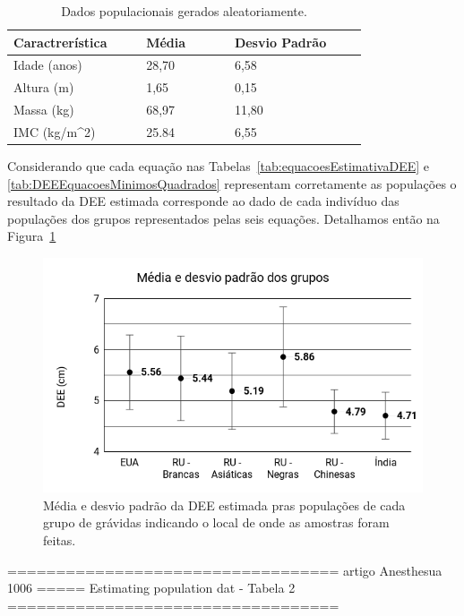 \begin{table}[!ht]
\begin{center}
\caption{Dados populacionais gerados aleatoriamente.}
\label{tab:DadosPopulacaoGerada}
\begin{tabular}{|p{0.3\linewidth}|p{0.2\linewidth}|p{0.3\linewidth}|}
\hline
\textbf{Caractrerística} & \textbf{Média} & \textbf{Desvio Padrão}\\
\hline\hline
Idade (anos) & 28,70 & 6,58\\
Altura (m) & 1,65 & 0,15\\
Massa (kg) & 68,97 & 11,80\\
IMC (kg/m^2) & 25.84 & 6,55\\
\hline
\end{tabular}
\end{center}
\end{table}

Considerando que cada equação nas Tabelas~\ref{tab:equacoesEstimativaDEE} e \ref{tab:DEEEquacoesMinimosQuadrados} representam corretamente as populações o resultado da \acrshort{DEE} estimada corresponde ao dado de cada indivíduo das populações dos grupos representados pelas seis equações. Detalhamos então na Figura~\ref{fig:mediaDesvioPadraoPopulacoes}

\begin{figure}[ht!]
    \centering
    \includegraphics[width=0.9\linewidth]{capitulos/figuras/Media e desvio padrao dos grupos.png} 
    \caption{Média e desvio padrão da \acrshort{DEE} estimada pras populações de cada grupo de grávidas indicando o local de onde as amostras foram feitas.}
    \label{fig:mediaDesvioPadraoPopulacoes}
\end{figure}

================================== artigo Anesthesua 1006 =====
Estimating population dat - Tabela 2
================================== 

